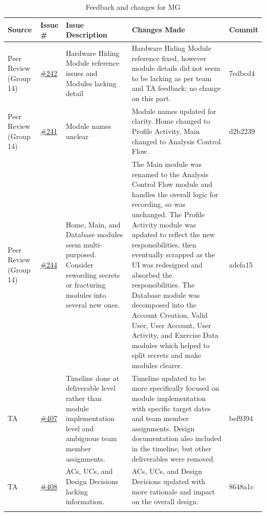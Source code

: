 \documentclass{article}
\begin{document}
{\small
\begin{xltabular}{\textwidth}{>{\raggedright\arraybackslash}X >{\raggedright\arraybackslash}p{0.8cm} >{\raggedright\arraybackslash}X >{\raggedright\arraybackslash}X >{\raggedright\arraybackslash}p{2.0cm}}
\toprule
\textbf{Source} & \textbf{Issue \#} & \textbf{Issue Description} & \textbf{Changes Made} & \textbf{Commit} \\
\midrule
Peer Review (Group 14) & \href{https://github.com/M9Huynh/technically-functional/issues/242}{\#242} & Hardware Hiding Module reference issues and Modules lacking detail & Hardware Hiding Module reference fixed, however module details did not seem to be lacking as per team and TA feedback; no change on this part. & 7edbcd4 \\
\midrule
Peer Review (Group 14) & \href{https://github.com/M9Huynh/technically-functional/issues/241}{\#241} & Module names unclear & Module names updated for clarity. Home changed to Profile Activity, Main changed to Analysis Control Flow. & d2b2239 \\
\midrule
Peer Review (Group 14) & \href{https://github.com/M9Huynh/technically-functional/issues/244}{\#244} & Home, Main, and Database modules seem multi-purposed. Consider rewording secrets or fracturing modules into several new ones. & The Main module was renamed to the Analysis Control Flow module and handles the overall logic for recording, so was unchanged. The Profile Activity module was updated to reflect the new responsibilities, then eventually scrapped as the UI was redesigned and absorbed the responsibilities. The Database module was decomposed into the Account Creation, Valid User, User Account, User Activity, and Exercise Data modules which helped to split secrets and make modules clearer. & adefa15 \\
\midrule
TA & \href{https://github.com/M9Huynh/technically-functional/issues/244}{\#407} & Timeline done at deliverable level rather than module implementation level and ambiguous team member assignments. & Timeline updated to be more specifically focused on module implementation with specific target dates and team member assignments. Design documentation also included in the timeline, but other deliverables were removed. & bef9394 \\
\midrule
TA & \href{https://github.com/M9Huynh/technically-functional/issues/408}{\#408} & ACs, UCs, and Design Decisions lacking information. & ACs, UCs, and Design Decisions updated with more rationale and impact on the overall design. & 8648a1c \\

\bottomrule
\caption{Feedback and changes for MG}
\label{tab:mg_feedback}
\end{xltabular}
}
\end{document}
